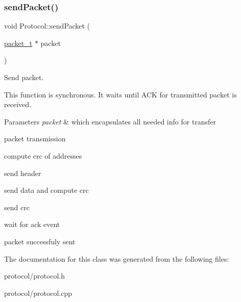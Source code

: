 \subsubsection{\texorpdfstring{send\+Packet()}{sendPacket()}}
{\footnotesize\ttfamily void Protocol\+::send\+Packet (\begin{DoxyParamCaption}\item[{\hyperlink{structpacket__t}{packet\+\_\+t} $\ast$}]{packet }\end{DoxyParamCaption})}



Send packet. 

This function is synchronous. It waits until A\+CK for transmitted packet is received.


\begin{DoxyParams}{Parameters}
{\em packet} & which encapsulates all needed info for transfer \\
\hline
\end{DoxyParams}
packet transmission

compute crc of addresses

send header

send data and compute crc

send crc

wait for ack event

packet successfuly sent 

The documentation for this class was generated from the following files\+:\begin{DoxyCompactItemize}
\item 
protocol/protocol.\+h\item 
protocol/protocol.\+cpp\end{DoxyCompactItemize}
